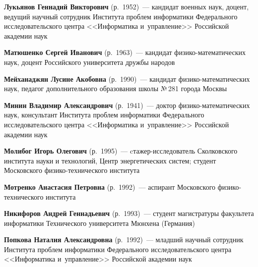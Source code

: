 \begin{multicols}{2}
\vspace*{3pt} 

\noindent
\textbf{Лукьянов Геннадий Викторович} (р.\ 1952)~---
кан\-дидат военных наук, доцент, ведущий научный сотрудник Института проб\-лем 
информатики Федерального исследовательского центра <<Информатика и~управ\-ле\-ние>>
Российской академии наук

\vspace*{3pt} 

\noindent
\textbf{Матюшенко Сергей Иванович} (р.\ 1963)~---
кандидат фи\-зи\-ко-ма\-те\-ма\-ти\-че\-ских наук, доцент Российского университета дружбы народов

\vspace*{3pt} 

\noindent
\textbf{Мейханаджян Лусине Акобовна} (р.\ 1990)~---
кандидат фи\-зи\-ко-ма\-те\-ма\-ти\-че\-ских наук, 
педагог допол\-нительного образования школы №\,281 города Москвы

\vspace*{3pt} 

\noindent
\textbf{Минин Владимир Александрович} (р.\ 1941)~--- 
доктор фи\-зи\-ко-ма\-те\-ма\-ти\-че\-ских наук, консультант Института проб\-лем 
информатики Федерального исследовательского центра <<Информатика и~управ\-ле\-ние>>
Российской академии наук 

\vspace*{3pt} 

\noindent
\textbf{Молибог Игорь Олегович} (р.\ 1995)~--- cта\-жер-ис\-сле\-до\-ва\-тель Сколковского 
института науки и технологий, Центр энергетических систем; 
студент Московского фи\-зи\-ко-тех\-ни\-че\-ско\-го института

\vspace*{3pt} 

\noindent
\textbf{Мотренко Анастасия Петровна} (р.\ 1992)~---
аспирант Московского  фи\-зи\-ко-тех\-ни\-че\-ско\-го института

\vspace*{3pt} 


\noindent
\textbf{Никифоров Андрей Геннадьевич} (р.\ 1993)~---
студент магистратуры факультета информатики Технического университета Мюнхена 
(Германия)


\vspace*{3pt} 

\noindent
\textbf{Попкова Наталия Александровна} (р.\ 1992)~---
младший научный сотрудник Института проб\-лем информатики Федерального 
исследовательского центра <<Информатика и~управ\-ле\-ние>> Российской акаде\-мии наук  


\end{multicols}
